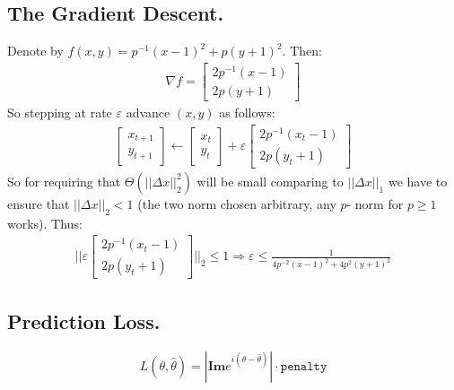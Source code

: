 \documentclass{article}
\begin{document}
\subsection{The Gradient Descent.} Denote by $f(x,y) = p^{-1}(x-1)^{2} + p(y+1)^2$. Then:
\begin{equation*}
    \begin{split}
        \nabla f = \begin{bmatrix}
          2p^{-1}(x-1)    \\
          2p(y+1)
        \end{bmatrix}
    \end{split}
\end{equation*}
So stepping at rate $\varepsilon$ advance $\left(x,y\right)$ as follows: 
\begin{equation*}
    \begin{split}
       \begin{bmatrix}
           x_{t+1} \\
           y_{t+1}
       \end{bmatrix} \leftarrow \begin{bmatrix}
           x_{t} \\
           y_{t}
       \end{bmatrix} +  \varepsilon \begin{bmatrix}
          2p^{-1}(x_{t}-1)    \\
          2p(y_{t}+1)
        \end{bmatrix} 
    \end{split}
\end{equation*}
So for requiring that $\Theta( ||\Delta x ||^2_{2})$ will be small comparing to $||\Delta x||_{1}$ we have to ensure that $||\Delta x||_{2} < 1$ (the two norm chosen arbitrary, any $p$- norm for $p \ge 1$ works). Thus:
\begin{equation*}
    \begin{split}
     || \varepsilon  \begin{bmatrix}
          2p^{-1}(x_{t}-1)    \\
          2p(y_{t}+1)
        \end{bmatrix} ||_{2}  \le 1 \Rightarrow \varepsilon \le \frac{1}{   4p^{-2}\left(x-1 \right)^{2}  + 4p^{2}\left(y+1 \right)^{2}  }      
    \end{split}
\end{equation*}

\subsection{Prediction Loss.}
\begin{equation*}
    L\left( \theta,\hat{\theta} \right) = |\textbf{Im} e^{i \left( \theta-\hat{\theta} \right)}| \cdot \texttt{penalty}
\end{equation*}
\end{document}
